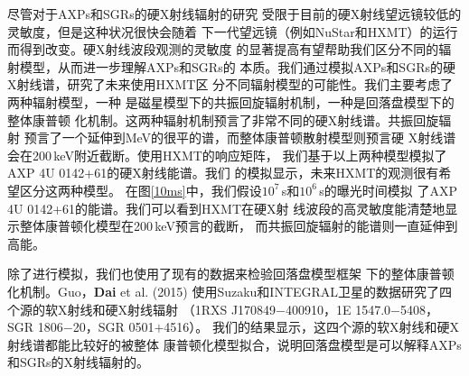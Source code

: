 尽管对于AXPs和SGRs的硬X射线辐射的研究
受限于目前的硬X射线望远镜较低的灵敏度，但是这种状况很快会随着
下一代望远镜（例如NuStar和HXMT）的运行而得到改变。硬X射线波段观测的灵敏度
的显著提高有望帮助我们区分不同的辐射模型，从而进一步理解AXPs和SGRs的
本质。我们通过模拟AXPs和SGRs的硬X射线谱，研究了未来使用HXMT区
分不同辐射模型的可能性。我们主要考虑了两种辐射模型，一种
是磁星模型下的共振回旋辐射机制，一种是回落盘模型下的整体康普顿
化机制。这两种辐射机制预言了非常不同的硬X射线谱。共振回旋辐射
预言了一个延伸到MeV的很平的谱，而整体康普顿散射模型则预言硬
X射线谱会在200\,keV附近截断。使用HXMT的响应矩阵，
我们基于以上两种模型模拟了AXP 4U 0142+61的硬X射线能谱。我们
的模拟显示，未来HXMT的观测很有希望区分这两种模型。
在图\ref{10ms}中，我们假设$10^7$\,s和$10^6$\,s的曝光时间模拟
了AXP 4U 0142+61的能谱。我们可以看到HXMT在硬X射
线波段的高灵敏度能清楚地显示整体康普顿化模型在200\,keV预言的截断，
而共振回旋辐射的能谱则一直延伸到高能。

除了进行模拟，我们也使用了现有的数据来检验回落盘模型框架
下的整体康普顿化机制。Guo，\textbf{Dai} et al. (2015)\supercite{gdl+14}
使用Suzaku和INTEGRAL卫星的数据研究了四个源的软X射线和硬X射线辐射
（1RXS J170849$-$400910，1E 1547.0$-$5408，SGR 1806$-$20，SGR 0501$+$4516）。
我们的结果显示，这四个源的软X射线和硬X射线谱都能比较好的被整体
康普顿化模型拟合，说明回落盘模型是可以解释AXPs和SGRs的X射线辐射的。


